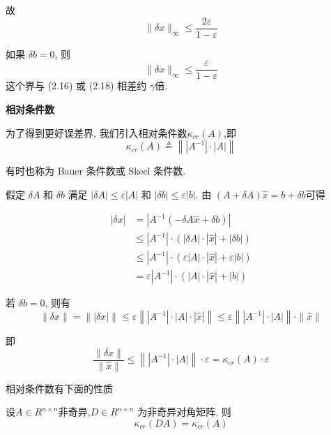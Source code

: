 \documentclass[12pt,a4paper]{article}
\begin{document}
故
\begin{equation}
\|\delta x\|_{\infty} \leq \frac{2 \varepsilon}{1-\varepsilon}
\end{equation}

如果 $δb = 0$, 则
\begin{equation}
\|\delta x\|_{\infty} \leq \frac{\varepsilon}{1-\varepsilon}
\end{equation}
这个界与 (2.16) 或 (2.18) 相差约 $\gamma$倍.


{\bfseries 相对条件数}

为了得到更好误差界, 我们引入相对条件数$\kappa_{cr}(A)$,即
\begin{equation}
\kappa_{c r}(A) \triangleq\left\|\left|A^{-1}\right| \cdot|A|\right\|
\end{equation}

有时也称为 Bauer 条件数或 Skeel 条件数.

假定 $δA$ 和 $δb$ 满足 $|δA| ≤ ε|A|$ 和 $|δb| ≤ ε|b|$. 由 $(A + δA)\hat{x} = b + δb $可得

\begin{equation}
\begin{aligned}|\delta x| &=\left|A^{-1}(-\delta A \hat{x}+\delta b)\right| \\ & \leq\left|A^{-1}\right| \cdot(|\delta A| \cdot|\hat{x}|+|\delta b|) \\ & \leq\left|A^{-1}\right| \cdot(\varepsilon|A| \cdot|\hat{x}|+\varepsilon|b|) \\ &=\varepsilon\left|A^{-1}\right| \cdot(|A| \cdot|\hat{x}|+|b|) \end{aligned}
\end{equation}

若 $δb = 0$, 则有
\begin{equation}
\|\delta x\|=\||\delta x|\| \leq \varepsilon\left\|\left|A^{-1}\right| \cdot|A| \cdot|\hat{x}|\right\| \leq \varepsilon\left\|\left|A^{-1}\right| \cdot|A|\right\| \cdot\|\hat{x}\|
\end{equation}

即
\begin{equation}
\frac{\|\delta x\|}{\|\hat{x}\|} \leq\left\|\left|A^{-1}\right| \cdot|A|\right\| \cdot \varepsilon=\kappa_{c r}(A) \cdot \varepsilon
\end{equation}

相对条件数有下面的性质

\begin{lemma}
	设$ A∈ R^{n×n}$非奇异,$D ∈ R^{n×n}$ 为非奇异对角矩阵, 则
	\begin{equation}
	\kappa_{c r}(D A)=\kappa_{c r}(A)
	\end{equation}
\end{lemma}
\end{document}
